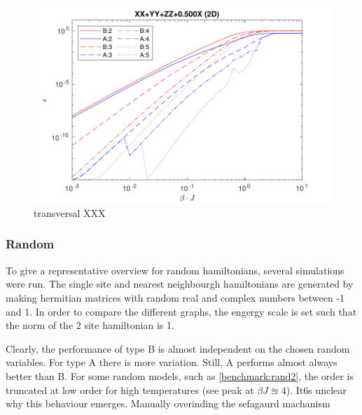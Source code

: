 \begin{figure}[H]
    \center
    \includegraphics[width=\textwidth]{Figuren/benchmarking/t_heis_XXX.pdf}
    \caption{transversal XXX}
    \label{fig:benchmark:tHeisenberg}
\end{figure}


\subsubsection{Random}

To give a representative overview for random hamiltonians, several simulations were run. The single site and nearest neighbourgh hamiltonians are generated by making hermitian matrices with random real and complex numbers between -1 and 1. In order to compare the different graphs, the engergy scale is set such that the norm of the 2 site hamiltonian is 1.

Clearly, the performance of type B is almost independent on the chosen random variables. For type A there is more variation. Still, A performs almost always better than B. For some random models, such as \cref{benchmark:rand2}, the order is truncated at low order for high temperatures (see peak at $\beta J \approxeq 4$). It6s unclear why this behaviour emerges. Manually overinding the sefagaurd machanism


